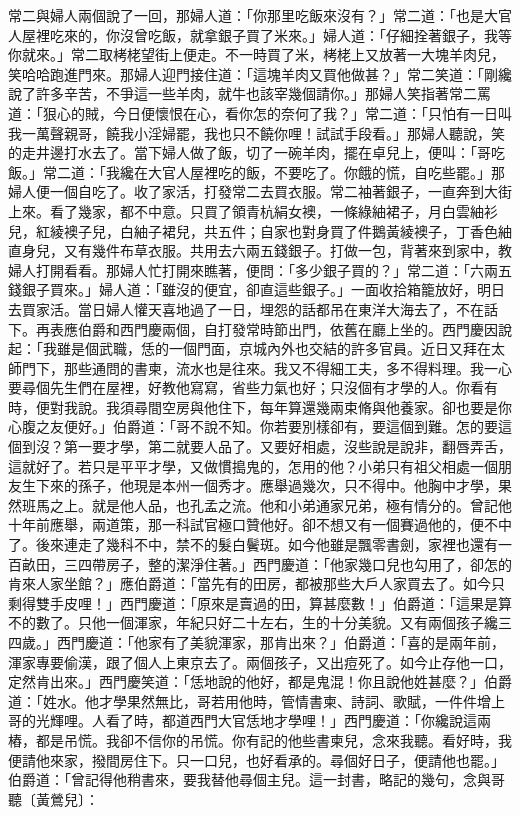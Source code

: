 \begin{showcontents}{}
常二與婦人兩個說了一回，那婦人道：「你那里吃飯來沒有？」常二道：「也是大官人屋裡吃來的，你沒曾吃飯，就拿銀子買了米來。」婦人道：「仔細拴著銀子，我等你就來。」常二取栲栳望街上便走。不一時買了米，栲栳上又放著一大塊羊肉兒，笑哈哈跑進門來。那婦人迎門接住道：「這塊羊肉又買他做甚？」常二笑道：「剛纔說了許多辛苦，不爭這一些羊肉，就牛也該宰幾個請你。」那婦人笑指著常二罵道：「狠心的賊，今日便懷恨在心，看你怎的奈何了我？」常二道：「只怕有一日叫我一萬聲親哥，饒我小淫婦罷，我也只不饒你哩！試試手段看。」那婦人聽說，笑的走井邊打水去了。當下婦人做了飯，切了一碗羊肉，擺在卓兒上，便叫：「哥吃飯。」常二道：「我纔在大官人屋裡吃的飯，不要吃了。你餓的慌，自吃些罷。」那婦人便一個自吃了。收了家活，打發常二去買衣服。常二袖著銀子，一直奔到大街上來。看了幾家，都不中意。只買了領青杭絹女襖，一條綠紬裙子，月白雲紬衫兒，紅綾襖子兒，白紬子裙兒，共五件；自家也對身買了件鵝黃綾襖子，丁香色紬直身兒，又有幾件布草衣服。共用去六兩五錢銀子。打做一包，背著來到家中，教婦人打開看看。那婦人忙打開來瞧著，便問：「多少銀子買的？」常二道：「六兩五錢銀子買來。」婦人道：「雖沒的便宜，卻直這些銀子。」一面收拾箱籠放好，明日去買家活。當日婦人懽天喜地過了一日，埋怨的話都吊在東洋大海去了，不在話下。再表應伯爵和西門慶兩個，自打發常時節出門，依舊在廳上坐的。西門慶因說起：「我雖是個武職，恁的一個門面，京城內外也交結的許多官員。近日又拜在太師門下，那些通問的書柬，流水也是往來。我又不得細工夫，多不得料理。我一心要尋個先生們在屋裡，好教他寫寫，省些力氣也好；只沒個有才學的人。你看有時，便對我說。我須尋間空房與他住下，每年算還幾兩束脩與他養家。卻也要是你心腹之友便好。」伯爵道：「哥不說不知。你若要別樣卻有，要這個到難。怎的要這個到沒？第一要才學，第二就要人品了。又要好相處，沒些說是說非，翻唇弄舌，這就好了。若只是平平才學，又做慣搗鬼的，怎用的他？小弟只有祖父相處一個朋友生下來的孫子，他現是本州一個秀才。應舉過幾次，只不得中。他胸中才學，果然班馬之上。就是他人品，也孔孟之流。他和小弟通家兄弟，極有情分的。曾記他十年前應舉，兩道策，那一科試官極口贊他好。卻不想又有一個賽過他的，便不中了。後來連走了幾科不中，禁不的髮白鬢斑。如今他雖是飄零書劍，家裡也還有一百畝田，三四帶房子，整的潔淨住著。」西門慶道：「他家幾口兒也勾用了，卻怎的肯來人家坐館？」應伯爵道：「當先有的田房，都被那些大戶人家買去了。如今只剩得雙手皮哩！」西門慶道：「原來是賣過的田，算甚麼數！」伯爵道：「這果是算不的數了。只他一個渾家，年紀只好二十左右，生的十分美貌。又有兩個孩子纔三四歲。」西門慶道：「他家有了美貌渾家，那肯出來？」伯爵道：「喜的是兩年前，渾家專要偷漢，跟了個人上東京去了。兩個孩子，又出痘死了。如今止存他一口，定然肯出來。」西門慶笑道：「恁地說的他好，都是鬼混！你且說他姓甚麼？」伯爵道：「姓水。他才學果然無比，哥若用他時，管情書柬、詩詞、歌賦，一件件增上哥的光輝哩。人看了時，都道西門大官恁地才學哩！」西門慶道：「你纔說這兩樁，都是吊慌。我卻不信你的吊慌。你有記的他些書柬兒，念來我聽。看好時，我便請他來家，撥間房住下。只一口兒，也好看承的。尋個好日子，便請他也罷。」伯爵道：「曾記得他稍書來，要我替他尋個主兒。這一封書，略記的幾句，念與哥聽〔黃鶯兒〕：


\end{showcontents}
